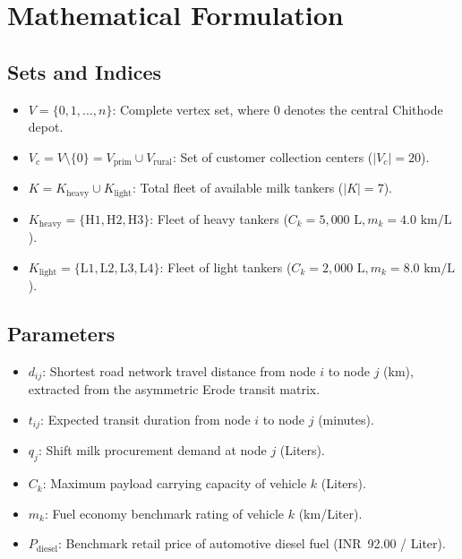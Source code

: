 \documentclass[11pt,a4paper]{article}
\begin{document}
\section{Mathematical Formulation}

\subsection{Sets and Indices}
\begin{itemize}
    \item $V = \{0, 1, \dots, n\}$: Complete vertex set, where $0$ denotes the central Chithode depot.
    \item $V_c = V \setminus \{0\} = V_{\text{prim}} \cup V_{\text{rural}}$: Set of customer collection centers ($|V_c| = 20$).
    \item $K = K_{\text{heavy}} \cup K_{\text{light}}$: Total fleet of available milk tankers ($|K| = 7$).
    \item $K_{\text{heavy}} = \{\text{H1}, \text{H2}, \text{H3}\}$: Fleet of heavy tankers ($C_k = 5{,}000\text{ L}, m_k = 4.0\text{ km/L}$).
    \item $K_{\text{light}} = \{\text{L1}, \text{L2}, \text{L3}, \text{L4}\}$: Fleet of light tankers ($C_k = 2{,}000\text{ L}, m_k = 8.0\text{ km/L}$).
\end{itemize}

\subsection{Parameters}
\begin{itemize}
    \item $d_{ij}$: Shortest road network travel distance from node $i$ to node $j$ (km), extracted from the asymmetric Erode transit matrix.
    \item $t_{ij}$: Expected transit duration from node $i$ to node $j$ (minutes).
    \item $q_j$: Shift milk procurement demand at node $j$ (Liters).
    \item $C_k$: Maximum payload carrying capacity of vehicle $k$ (Liters).
    \item $m_k$: Fuel economy benchmark rating of vehicle $k$ (km/Liter).
    \item $P_{\text{diesel}}$: Benchmark retail price of automotive diesel fuel (INR~92.00 / Liter).
\end{itemize}
\end{document}
